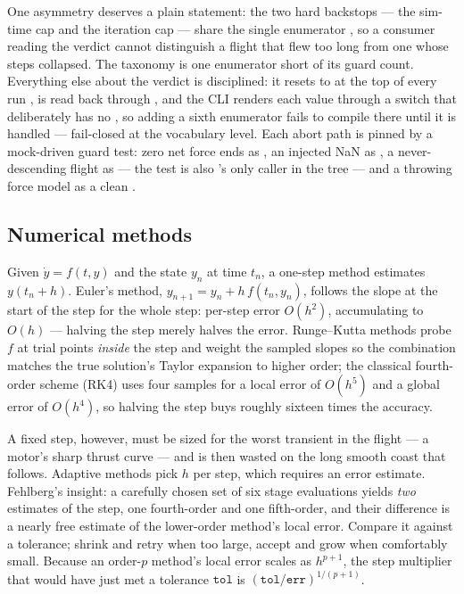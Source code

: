 One asymmetry deserves a plain statement: the two hard backstops --- the sim-time cap and the
iteration cap --- share the single  enumerator
, so a consumer reading the verdict cannot distinguish a flight that
flew too long from one whose steps collapsed. The taxonomy is one enumerator short of its guard
count. Everything else about the verdict is disciplined: it resets to  at the top
of every run , is read back through
 , and the CLI renders each value
through a switch that deliberately has no , so adding a sixth enumerator fails to
compile there until it is handled  --- fail-closed at the vocabulary level.
Each abort path is pinned by a mock-driven guard test: zero net force ends as 
, an injected NaN as 
, a never-descending flight as 
 --- the test is also 's only caller in
the tree --- and a throwing force model as a clean 
.

\subsection{Numerical methods}\label{sec:simcore-numerics}

\begin{physbox}
Given $\dot{y}=f(t,y)$ and the state $y_n$ at time $t_n$, a one-step method estimates
$y(t_n+h)$. Euler's method, $y_{n+1}=y_n+h\,f(t_n,y_n)$, follows the slope at the start of the
step for the whole step: per-step error $O(h^2)$, accumulating to $O(h)$ --- halving the step
merely halves the error. Runge--Kutta methods probe $f$ at trial points \emph{inside} the step
and weight the sampled slopes so the combination matches the true solution's Taylor expansion to
higher order; the classical fourth-order scheme (RK4) uses four samples for a local error of
$O(h^5)$ and a global error of $O(h^4)$, so halving the step buys roughly sixteen times the
accuracy.

A fixed step, however, must be sized for the worst transient in the flight --- a motor's sharp
thrust curve --- and is then wasted on the long smooth coast that follows. Adaptive methods pick
$h$ per step, which requires an error estimate. Fehlberg's insight: a carefully chosen set of
six stage evaluations yields \emph{two} estimates of the step, one fourth-order and one
fifth-order, and their difference is a nearly free estimate of the lower-order method's local
error. Compare it against a tolerance; shrink and retry when too large, accept and grow when
comfortably small. Because an order-$p$ method's local error scales as $h^{p+1}$, the step
multiplier that would have just met a tolerance $\mathtt{tol}$ is
$(\mathtt{tol}/\mathtt{err})^{1/(p+1)}$.
\end{physbox}

